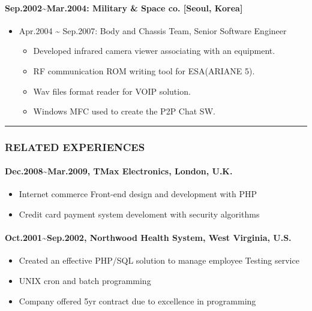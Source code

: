 \documentclass[12pt,a4paper]{article}
\begin{document}
\paragraph{Sep.2002{\textasciitilde}Mar.2004: Military \& Space co. [Seoul, Korea]}
\begin{itemize}
\item Apr.2004 {\textasciitilde} Sep.2007: Body and Chassis Team, Senior Software Engineer

\begin{itemize}
\item Developed infrared camera viewer associating with an equipment.


\item RF communication ROM writing tool for ESA(ARIANE 5).


\item Wav files format reader for VOIP solution.


\item Windows MFC used to create the P2P Chat SW. 

\end{itemize}
\end{itemize}
\rule{\textwidth}{1pt}
\subsubsection{RELATED EXPERIENCES}
\paragraph{Dec.2008{\textasciitilde}Mar.2009, TMax Electronics, London, U.K.}
\begin{itemize}
\item Internet commerce Front-end design and development with PHP


\item Credit card payment system develoment with security algorithms

\end{itemize}
\paragraph{Oct.2001{\textasciitilde}Sep.2002, Northwood Health System, West Virginia, U.S.}
\begin{itemize}
\item Created an effective PHP/SQL solution to manage employee Testing service


\item UNIX cron and batch programming


\item Company offered 5yr contract due to excellence in programming

\end{itemize}
\end{document}
